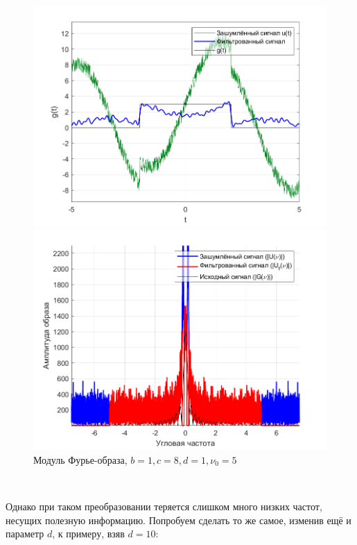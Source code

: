 \documentclass[a4paper]{article}
\begin{document}
\begin{figure}[H]
    \begin{minipage}{0.5\textwidth}
        \centering
        \includegraphics[width=\textwidth]{part2/1_8_1n.png}
        \caption{$b = 1, c = 8, d = 1, \nu_0 = 5$}
    \end{minipage}    
    \begin{minipage}{0.5\textwidth}
        \centering
        \includegraphics[width=\textwidth]{part2/1_8_1_Fourier_n.png}
        \caption{Модуль Фурье-образа, $b = 1, c = 8, d = 1, \nu_0 = 5$}
    \end{minipage}
\end{figure}\

Однако при таком преобразовании теряется слишком много низких частот, несущих полезную информацию. Попробуем сделать то же самое, изменив ещё и параметр $d$, к примеру, взяв $d = 10$:
\end{document}
